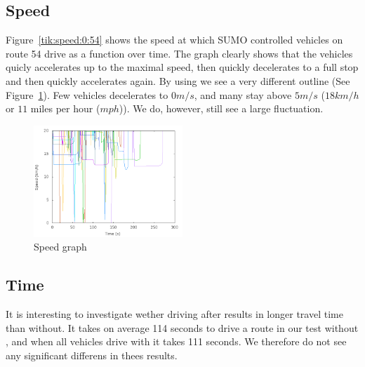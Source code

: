 \subsection{Speed}
Figure~\ref{tik:speed:0:54} shows the speed at which SUMO controlled vehicles on route 54 drive as a function over time.
The graph clearly shows that the vehicles quicly accelerates up to the maximal speed, then quickly decelerates to a full stop and then quickly accelerates again.
By using \tech we see a very different outline (See Figure~\ref{fig:TestResults:speed100}).
Few vehicles decelerates to $0 m/s$, and many stay above $5 m/s$ ($18 km/h$ or $11$ miles per hour ($mph$)).
We do, however, still see a large fluctuation.
\begin{figure}[htb]
\includegraphics[width=0.5\textwidth]{images/speed100.png}
\caption{Speed graph}
\label{fig:TestResults:speed100}
\end{figure}



\subsection{Time}
It is interesting to investigate wether driving after \tech results in longer travel time than without.
It takes on average 114 seconds to drive a route in our test without \tech, and when all vehicles drive with \tech it takes 111 seconds. 
We therefore do not see any significant differens in thees results.


